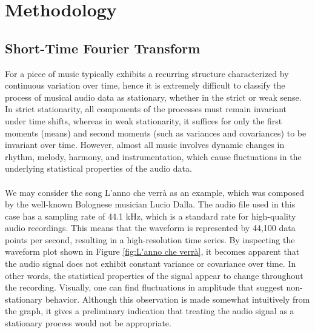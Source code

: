 \chapter{Methodology}

\section{Short-Time Fourier Transform}
For a piece of music typically exhibits a recurring structure characterized by continuous variation over time, hence it is extremely difficult to classify the process of musical audio data as stationary, whether in the strict or weak sense. In strict stationarity, all components of the processes must remain invariant under time shifts, whereas in weak stationarity, it suffices for only the first moments (means) and second moments (such as variances and covariances) to be invariant over time. However, almost all music involves dynamic changes in rhythm, melody, harmony, and instrumentation, which cause fluctuations in the underlying statistical properties of the audio data.\\
\\
We may consider the song L'anno che verrà as an example, which was composed by the well-known Bolognese musician Lucio Dalla. The audio file used in this case has a sampling rate of 44.1 kHz, which is a standard rate for high-quality audio recordings. This means that the waveform is represented by 44,100 data points per second, resulting in a high-resolution time series. By inspecting the waveform plot shown in Figure \ref{fig:L'anno che verrà}, it becomes apparent that the audio signal does not exhibit constant variance or covariance over time. In other words, the statistical properties of the signal appear to change throughout the recording. Visually, one can find fluctuations in amplitude that suggest non-stationary behavior. Although this observation is made somewhat intuitively from the graph, it gives a preliminary indication that treating the audio signal as a stationary process would not be appropriate.\\
